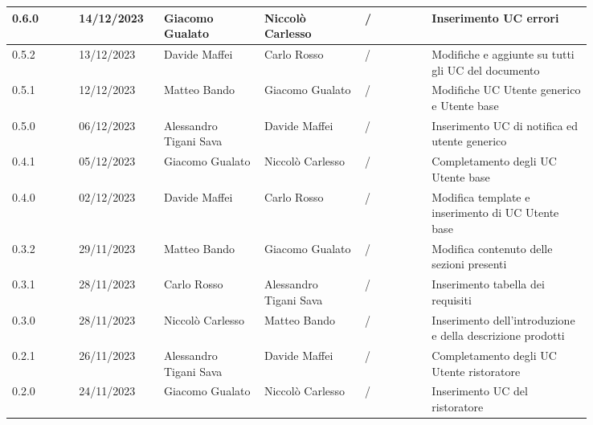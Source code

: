 {\begin{longtable}{p{0.10\linewidth}p{0.10\linewidth}p{0.15\linewidth}p{0.15\linewidth}p{0.10\linewidth}p{0.24\linewidth}}
	  \hline
	  0.6.0             & 14/12/2023    & Giacomo Gualato        & Niccolò Carlesso       & /                      & Inserimento UC errori                                                    \\
	  \hline
	  0.5.2             & 13/12/2023    & Davide Maffei          & Carlo Rosso            & /                      & Modifiche e aggiunte su tutti gli UC del documento                       \\
	  \hline
	  0.5.1             & 12/12/2023    & Matteo Bando           & Giacomo Gualato        & /                      & Modifiche UC Utente generico e Utente base                               \\
	  \hline
	  0.5.0             & 06/12/2023    & Alessandro Tigani Sava & Davide Maffei          & /                      & Inserimento UC di notifica ed utente generico                            \\
	  \hline
	  0.4.1             & 05/12/2023    & Giacomo Gualato        & Niccolò Carlesso       & /                      & Completamento degli UC Utente base                                       \\
	  \hline
	  0.4.0             & 02/12/2023    & Davide Maffei          & Carlo Rosso            & /                      & Modifica template e inserimento di UC Utente base                        \\
	  \hline
	  0.3.2             & 29/11/2023    & Matteo Bando           & Giacomo Gualato        & /                      & Modifica contenuto delle sezioni presenti                                \\
	  \hline
	  0.3.1             & 28/11/2023    & Carlo Rosso            & Alessandro Tigani Sava & /                      & Inserimento tabella dei requisiti                                        \\
	  \hline
	  0.3.0             & 28/11/2023    & Niccolò Carlesso       & Matteo Bando           & /                      & Inserimento dell'introduzione e della descrizione prodotti               \\
	  \hline
	  0.2.1             & 26/11/2023    & Alessandro Tigani Sava & Davide Maffei          & /                      & Completamento degli UC Utente ristoratore                                \\
	  \hline
	  0.2.0             & 24/11/2023    & Giacomo Gualato        & Niccolò Carlesso       & /                      & Inserimento UC del ristoratore                                           \\

\end{longtable}}
